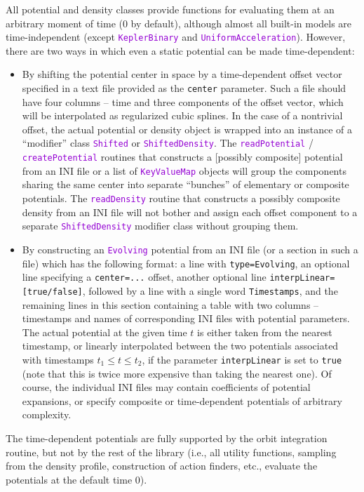 \documentclass[12pt]{article}
\newcommand{\ttt}[1]{\textcolor{darkviolet}{\texttt{#1}}}
\newcommand{\ppp}[1]{\textcolor{darkolive} {\texttt{#1}}}
\begin{document}
All potential and density classes provide functions for evaluating them at an arbitrary moment of time (0 by default), although almost all built-in models are time-independent (except \ttt{KeplerBinary} and \ttt{UniformAcceleration}). However, there are two ways in which even a static potential can be made time-dependent:
\begin{itemize}
\item By shifting the potential center in space by a time-dependent offset vector specified in a text file provided as the \ppp{center} parameter. Such a file should have four columns -- time and three components of the offset vector, which will be interpolated as regularized cubic splines. 
In the case of a nontrivial offset, the actual potential or density object is wrapped into an instance of a ``modifier'' class \ttt{Shifted} or \ttt{ShiftedDensity}. The \ttt{readPotential} / \ttt{createPotential} routines that constructs a [possibly composite] potential from an INI file or a list of \ttt{KeyValueMap} objects will group the components sharing the same center into separate ``bunches'' of elementary or composite potentials. The \ttt{readDensity} routine that constructs a possibly composite density from an INI file will not bother and assign each offset component to a separate \ttt{ShiftedDensity} modifier class without grouping them.
\item By constructing an \ttt{Evolving} potential from an INI file (or a section in such a file) which has the following format: a line with \ppp{type=Evolving}, an optional line specifying a \ppp{center=...} offset, another optional line \ppp{interpLinear=[true/false]}, followed by a line with a single word \texttt{Timestamps}, and the remaining lines in this section containing a table with two columns -- timestamps and names of corresponding INI files with potential parameters. The actual potential at the given time $t$ is either taken from the nearest timestamp, or linearly interpolated between the two potentials associated with timestamps $t_1 \le t \le t_2$, if the parameter \ppp{interpLinear} is set to \texttt{true} (note that this is twice more expensive than taking the nearest one). Of course, the individual INI files may contain coefficients of potential expansions, or specify composite or time-dependent potentials of arbitrary complexity.
\end{itemize}
The time-dependent potentials are fully supported by the orbit integration routine, but not by the rest of the library (i.e., all utility functions, sampling from the density profile, construction of action finders, etc., evaluate the potentials at the default time 0).
\end{document}
